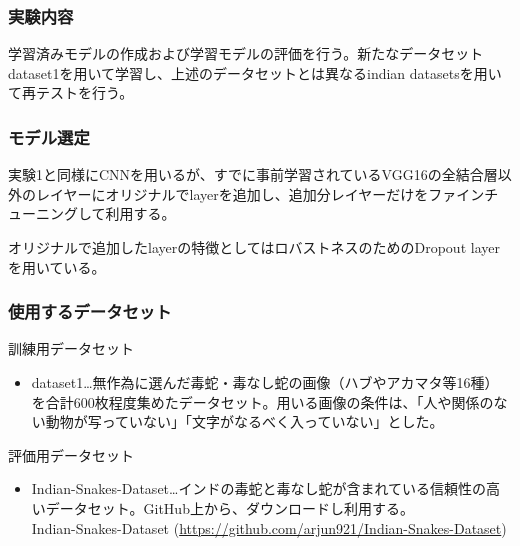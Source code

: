 \documentclass[a4paper, 11pt, titlepage]{jsarticle}
\begin{document}
\subsubsection{実験内容}
学習済みモデルの作成および学習モデルの評価を行う。新たなデータセットdataset1を用いて学習し、上述のデータセットとは異なるindian datasetsを用いて再テストを行う。

\subsubsection{モデル選定}
実験1と同様にCNNを用いるが、すでに事前学習されているVGG16の全結合層以外のレイヤーにオリジナルでlayerを追加し、追加分レイヤーだけをファインチューニングして利用する。\par
オリジナルで追加したlayerの特徴としてはロバストネスのためのDropout layerを用いている。

\subsubsection{使用するデータセット}
訓練用データセット
\begin{itemize}
\item dataset1…無作為に選んだ毒蛇・毒なし蛇の画像（ハブやアカマタ等16種）を合計600枚程度集めたデータセット。用いる画像の条件は、「人や関係のない動物が写っていない」「文字がなるべく入っていない」とした。
\end{itemize}\par
評価用データセット
\begin{itemize}
\item Indian-Snakes-Dataset…インドの毒蛇と毒なし蛇が含まれている信頼性の高いデータセット。GitHub上から、ダウンロードし利用する。\\
Indian-Snakes-Dataset  (\url{https://github.com/arjun921/Indian-Snakes-Dataset})
\end{itemize}
\end{document}
